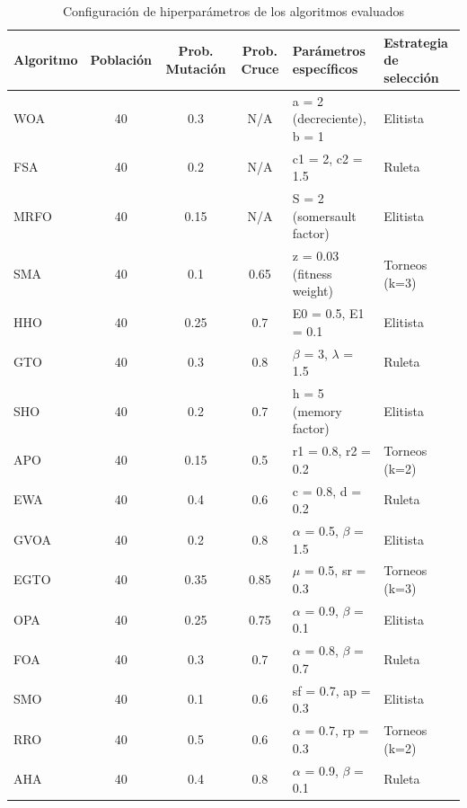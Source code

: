 \documentclass[10pt,a4paper]{extarticle}
\begin{document}
\begin{table}[!htbp]
  \centering
  \caption{Configuración de hiperparámetros de los algoritmos evaluados}
  \label{tab:hyperparams}
  \small
  \begin{tabular}{lcccll}
    \toprule
    \textbf{Algoritmo} & \textbf{Población} & \textbf{Prob. Mutación} & \textbf{Prob. Cruce} & \textbf{Parámetros específicos} & \textbf{Estrategia de selección} \\
    \midrule
    WOA & 40 & 0.3 & N/A & a = 2 (decreciente), b = 1 & Elitista \\
    FSA & 40 & 0.2 & N/A & c1 = 2, c2 = 1.5 & Ruleta \\
    MRFO & 40 & 0.15 & N/A & S = 2 (somersault factor) & Elitista \\
    SMA & 40 & 0.1 & 0.65 & z = 0.03 (fitness weight) & Torneos (k=3) \\
    HHO & 40 & 0.25 & 0.7 & E0 = 0.5, E1 = 0.1 & Elitista \\
    GTO & 40 & 0.3 & 0.8 & $\beta$ = 3, $\lambda$ = 1.5 & Ruleta \\
    SHO & 40 & 0.2 & 0.7 & h = 5 (memory factor) & Elitista \\
    APO & 40 & 0.15 & 0.5 & r1 = 0.8, r2 = 0.2 & Torneos (k=2) \\
    EWA & 40 & 0.4 & 0.6 & c = 0.8, d = 0.2 & Ruleta \\
    GVOA & 40 & 0.2 & 0.8 & $\alpha$ = 0.5, $\beta$ = 1.5 & Elitista \\
    EGTO & 40 & 0.35 & 0.85 & $\mu$ = 0.5, sr = 0.3 & Torneos (k=3) \\
    OPA & 40 & 0.25 & 0.75 & $\alpha$ = 0.9, $\beta$ = 0.1 & Elitista \\
    FOA & 40 & 0.3 & 0.7 & $\alpha$ = 0.8, $\beta$ = 0.7 & Ruleta \\
    SMO & 40 & 0.1 & 0.6 & sf = 0.7, ap = 0.3 & Elitista \\
    RRO & 40 & 0.5 & 0.6 & $\alpha$ = 0.7, rp = 0.3 & Torneos (k=2) \\
    AHA & 40 & 0.4 & 0.8 & $\alpha$ = 0.9, $\beta$ = 0.1 & Ruleta \\
    \bottomrule
  \end{tabular}
\end{table}
\end{document}
